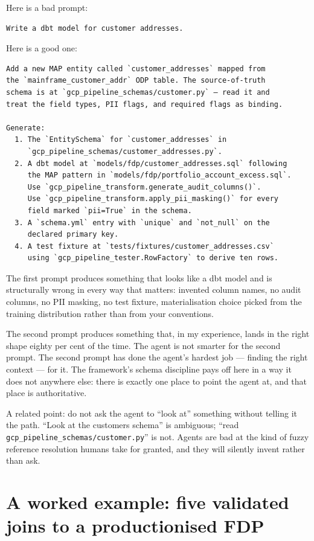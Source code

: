 \documentclass[
  11pt,
  british,
  oneside]{book}
\begin{document}
Here is a bad prompt:

\begin{verbatim}
Write a dbt model for customer addresses.
\end{verbatim}

Here is a good one:

\begin{verbatim}
Add a new MAP entity called `customer_addresses` mapped from
the `mainframe_customer_addr` ODP table. The source-of-truth
schema is at `gcp_pipeline_schemas/customer.py` — read it and
treat the field types, PII flags, and required flags as binding.

Generate:
  1. The `EntitySchema` for `customer_addresses` in
     `gcp_pipeline_schemas/customer_addresses.py`.
  2. A dbt model at `models/fdp/customer_addresses.sql` following
     the MAP pattern in `models/fdp/portfolio_account_excess.sql`.
     Use `gcp_pipeline_transform.generate_audit_columns()`.
     Use `gcp_pipeline_transform.apply_pii_masking()` for every
     field marked `pii=True` in the schema.
  3. A `schema.yml` entry with `unique` and `not_null` on the
     declared primary key.
  4. A test fixture at `tests/fixtures/customer_addresses.csv`
     using `gcp_pipeline_tester.RowFactory` to derive ten rows.
\end{verbatim}

The first prompt produces something that looks like a dbt model and is
structurally wrong in every way that matters: invented column names, no
audit columns, no PII masking, no test fixture, materialisation choice
picked from the training distribution rather than from your conventions.

The second prompt produces something that, in my experience, lands in
the right shape eighty per cent of the time. The agent is not smarter
for the second prompt. The second prompt has done the agent's hardest
job --- finding the right context --- for it. The framework's schema
discipline pays off here in a way it does not anywhere else: there is
exactly one place to point the agent at, and that place is
authoritative.

A related point: do not ask the agent to ``look at'' something without
telling it the path. ``Look at the customers schema'' is ambiguous;
``read \texttt{gcp\_pipeline\_schemas/customer.py}'' is not. Agents are
bad at the kind of fuzzy reference resolution humans take for granted,
and they will silently invent rather than ask.

\hypertarget{a-worked-example-five-validated-joins-to-a-productionised-fdp}{%
\section{A worked example: five validated joins to a productionised
FDP}\label{a-worked-example-five-validated-joins-to-a-productionised-fdp}}
\end{document}
